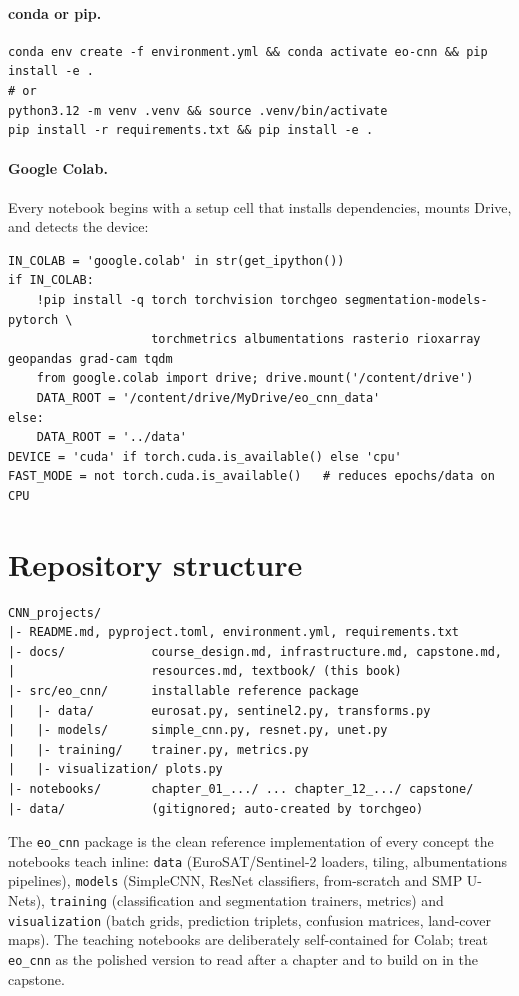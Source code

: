 \paragraph{conda or pip.}
\begin{lstlisting}
conda env create -f environment.yml && conda activate eo-cnn && pip install -e .
# or
python3.12 -m venv .venv && source .venv/bin/activate
pip install -r requirements.txt && pip install -e .
\end{lstlisting}

\paragraph{Google Colab.} Every notebook begins with a setup cell that installs
dependencies, mounts Drive, and detects the device:
\begin{lstlisting}
IN_COLAB = 'google.colab' in str(get_ipython())
if IN_COLAB:
    !pip install -q torch torchvision torchgeo segmentation-models-pytorch \
                    torchmetrics albumentations rasterio rioxarray geopandas grad-cam tqdm
    from google.colab import drive; drive.mount('/content/drive')
    DATA_ROOT = '/content/drive/MyDrive/eo_cnn_data'
else:
    DATA_ROOT = '../data'
DEVICE = 'cuda' if torch.cuda.is_available() else 'cpu'
FAST_MODE = not torch.cuda.is_available()   # reduces epochs/data on CPU
\end{lstlisting}

\section{Repository structure}

\begin{lstlisting}
CNN_projects/
|- README.md, pyproject.toml, environment.yml, requirements.txt
|- docs/            course_design.md, infrastructure.md, capstone.md,
|                   resources.md, textbook/ (this book)
|- src/eo_cnn/      installable reference package
|   |- data/        eurosat.py, sentinel2.py, transforms.py
|   |- models/      simple_cnn.py, resnet.py, unet.py
|   |- training/    trainer.py, metrics.py
|   |- visualization/ plots.py
|- notebooks/       chapter_01_.../ ... chapter_12_.../ capstone/
|- data/            (gitignored; auto-created by torchgeo)
\end{lstlisting}

The \texttt{eo\_cnn} package is the clean reference implementation of every
concept the notebooks teach inline: \texttt{data} (EuroSAT/Sentinel-2 loaders,
tiling, albumentations pipelines), \texttt{models} (SimpleCNN, ResNet
classifiers, from-scratch and SMP U-Nets), \texttt{training} (classification and
segmentation trainers, metrics) and \texttt{visualization} (batch grids,
prediction triplets, confusion matrices, land-cover maps). The teaching
notebooks are deliberately self-contained for Colab; treat \texttt{eo\_cnn} as
the polished version to read after a chapter and to build on in the capstone.

